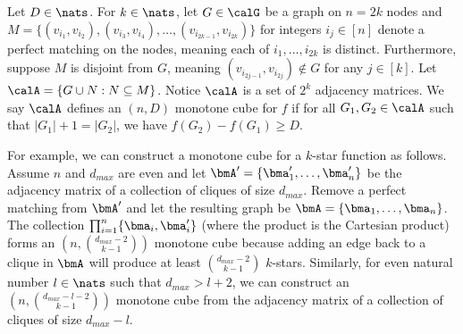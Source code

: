 \begin{definition}
  Let $D \in \nats$. 
  For $k \in \nats$, let $G \in \calG$ be a graph on $n = 2k$ nodes and $M = \{(v_{i_1}, v_{i_2}),
  (v_{i_3},v_{i_4}),\ldots,(v_{i_{2k-1}},v_{i_{2k}})\}$ for integers $i_j \in [n]$ denote a perfect
  matching on the 
  nodes, 
  meaning each 
  of $i_1, \ldots, i_{2k}$ 
  is distinct. Furthermore,
  suppose 
  $M$ is disjoint from $G$, meaning 
  $(v_{i_{2j-1}}, v_{i_{2j}}) \notin G$ for any $j\in[k]$. 
  Let $\calA = \{G \cup N : N \subseteq M\}$.
  Notice $\calA$ is a set of $2^k$ adjacency matrices. 
  We say $\calA$ defines an $(n,D)$ monotone cube for $f$ if for all $G_1, G_2
  \in \calA$ such that $|G_1| + 1 = |G_2|$, we have
  $f(G_2) - f(G_1) \geq D$.

\end{definition}


For example, we can construct 
a monotone cube for 
a $k$-star function 
as follows. 
Assume $n$ and $d_{max}$ are even and let $\bmA' = \{\bma_1',
\ldots, \bma_n'\}$ be the adjacency matrix of a collection of cliques of size
$d_{max}$. 
Remove a perfect matching from $\bmA'$ and let 
the resulting graph be $\bmA = \{\bma_1,\ldots, \bma_n\}$.
The collection $\prod_{i=1}^n \{\bma_i, \bma_i'\}$ (where the product is the Cartesian product) 
forms an
$(n,\binom{d_{max}-2}{k-1})$ 
monotone cube 
because adding
an edge back to a clique in $\bmA$ will produce at least
$\binom{d_{max}-2}{k-1}$ 
$k$-stars.
Similarly, for even natural number $l \in \nats$ such that $d_{max}>l+2$, we can construct an $(n,\binom{d_{max}-l-2}{k-1})$ monotone cube from the adjacency matrix of a collection of cliques of size $d_{max}-l$.

